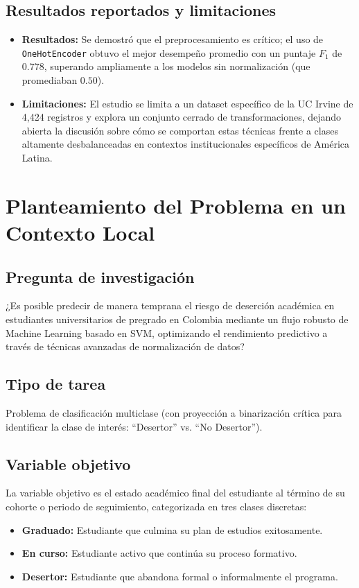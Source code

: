 \documentclass[12pt,a4paper]{article}
\begin{document}
\subsection{Resultados reportados y limitaciones}
\begin{itemize}
    \item \textbf{Resultados:} Se demostró que el preprocesamiento es crítico; el uso de \texttt{OneHotEncoder} obtuvo el mejor desempeño promedio con un puntaje $F_1$ de $0.778$, superando ampliamente a los modelos sin normalización (que promediaban $0.50$).
    \item \textbf{Limitaciones:} El estudio se limita a un dataset específico de la UC Irvine de 4,424 registros y explora un conjunto cerrado de transformaciones, dejando abierta la discusión sobre cómo se comportan estas técnicas frente a clases altamente desbalanceadas en contextos institucionales específicos de América Latina.
\end{itemize}

\section{Planteamiento del Problema en un Contexto Local}

\subsection{Pregunta de investigación}
¿Es posible predecir de manera temprana el riesgo de deserción académica en estudiantes universitarios de pregrado en Colombia mediante un flujo robusto de Machine Learning basado en SVM, optimizando el rendimiento predictivo a través de técnicas avanzadas de normalización de datos?

\subsection{Tipo de tarea}
Problema de clasificación multiclase (con proyección a binarización crítica para identificar la clase de interés: ``Desertor'' vs. ``No Desertor'').

\subsection{Variable objetivo}
La variable objetivo es el estado académico final del estudiante al término de su cohorte o periodo de seguimiento, categorizada en tres clases discretas:
\begin{itemize}
    \item \textbf{Graduado:} Estudiante que culmina su plan de estudios exitosamente.
    \item \textbf{En curso:} Estudiante activo que continúa su proceso formativo.
    \item \textbf{Desertor:} Estudiante que abandona formal o informalmente el programa.
\end{itemize}
\end{document}
